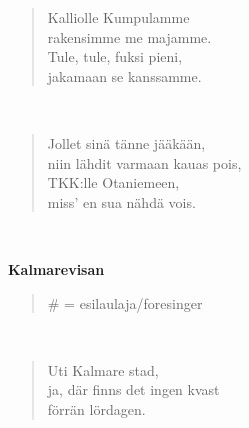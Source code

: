 \noindent\begin{minipage}{\linewidth}
\begin{verse}
	Kalliolle Kumpulamme\\
	rakensimme me majamme.\\
	Tule, tule, fuksi pieni,\\
	jakamaan se kanssamme.\\
\end{verse}
\end{minipage}\\[10pt]
\noindent\begin{minipage}{\linewidth}
\begin{verse}
	Jollet sinä tänne jääkään,\\
	niin lähdit varmaan kauas pois,\\
	TKK:lle Otaniemeen,\\
	miss' en sua nähdä vois.\\
\end{verse}
\end{minipage}\\[10pt]
%
%
\noindent\begin{minipage}{\linewidth}
\vspace{5pt}
\parbox[t]{0.85\linewidth}{\raggedright {\large\bf Kalmarevisan}\\[6pt]}
\begin{verse}
	\hspace{0pt-\widthof{\# }}\# = esilaulaja/foresinger\\
\end{verse}
\end{minipage}\\[10pt]
\noindent\begin{minipage}{\linewidth}
\begin{verse}
	Uti Kalmare stad,\\
	ja, där finns det ingen kvast\\
	förrän lördagen.\\
\end{verse}
\end{minipage}\\[10pt]
